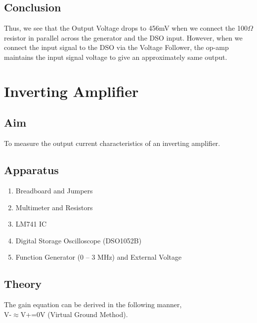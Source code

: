 \documentclass{article}
\begin{document}
\subsection{Conclusion}
Thus, we see that the Output Voltage drops to 456mV when we connect the 100$\Omega$ resistor in parallel across the generator and the DSO input. However, when we connect the input signal to the DSO via the Voltage Follower, the op-amp maintains the input signal voltage to give an approximately same output.

\newpage
\section{Inverting Amplifier}
\subsection{Aim}
To measure the output current characteristics of an inverting amplifier.
\subsection{Apparatus}
\begin{enumerate}
\item Breadboard and Jumpers
\item Multimeter and Resistors
\item LM741 IC
\item Digital Storage Oscilloscope (DSO1052B)
\item Function Generator (0 – 3 MHz) and External Voltage
\end{enumerate}

\subsection{Theory}
\begin{figure}
\end{figure}
The gain equation can be derived in the following manner, \\ V-$\approx$V+=0V (Virtual Ground Method). \\
\end{document}
